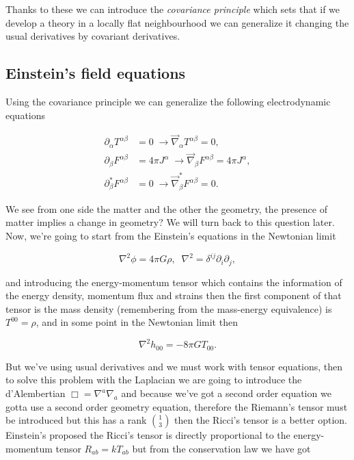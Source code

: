    Thanks to these we can introduce the \textit{covariance principle} which sets that if we develop a theory in a locally flat neighbourhood we can generalize it changing the usual derivatives by covariant derivatives.
    
    \subsection{Einstein's field equations}

        Using the covariance principle we can generalize the following electrodynamic equations

        \begin{align}
            \partial_{\alpha}T^{\alpha\beta}&=0\;\rightarrow\Vec{\nabla}_{\alpha}T^{\alpha\beta}=0,\\
            \partial_{\beta}F^{\alpha\beta}&=4\pi J^{\alpha}\;\rightarrow \Vec{\nabla}_{\beta}F^{\alpha\beta}=4\pi J^{\alpha},\\
            \partial_{\beta}^*F^{\alpha\beta}&=0\;\rightarrow \Vec{\nabla}_{\beta}^*F^{\alpha\beta}=0.
        \end{align}

We see from one side the matter and the other the geometry, the presence of matter implies a change in geometry? We will turn back to this question later. Now, we're going to start from the Einstein's equations in the Newtonian limit

\begin{equation}
    \nabla^2\phi=4\pi G\rho,\;\;\nabla^2 = \delta^{ij}\partial_i\partial_j,
\end{equation}

and introducing the energy-momentum tensor which contains the information of the energy density, momentum flux and strains then the first component of that tensor is the mass density (remembering from the mass-energy equivalence) is $T^{00}=\rho$, and in some point in the Newtonian limit then

\begin{equation}
    \nabla^2h_{00} = -8\pi GT_{00}.
\end{equation}

But we've using usual derivatives and we must work with tensor equations, then to solve this problem with the Laplacian we are going to introduce the d'Alembertian $\Box = \nabla^a\nabla_a$ and because we've got a second order equation we gotta use a second order geometry equation, therefore the Riemann's tensor must be introduced but this has a rank $\binom{1}{3}$ then the Ricci's tensor is a better option. Einstein's proposed the Ricci's tensor is directly proportional to the energy-momentum tensor $R_{ab}=kT_{ab}$  but from the conservation law we have got

